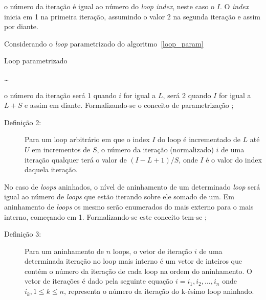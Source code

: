 o número da iteração é igual ao número do \textit{loop index}, neste caso o $I$.
O \textit{index} inicia em 1 na primeira iteração, assumindo o valor 2 na
segunda iteração e assim por diante.

Considerando o \textit{loop} parametrizado do algoritmo~\ref{loop_param}

\begin{algorithm}
        \caption{Loop parametrizado}
        \label{loop_param}
        \begin{algorithmic}[1]
                \STATE \ldots
                \ENDFOR
        \end{algorithmic}
\end{algorithm}

\noindent o número da iteração será 1 quando $i$ for igual a $L$, será 2 quando $I$ for
igual a $L+S$ e assim em diante. 
Formalizando-se o conceito de parametrização \cite[2.2]{ocfma};

\begin{description}
        \item [Definição 2:] Para um loop arbitrário em que o index $I$ do loop é
        incrementado de $L$ até $U$ em incrementos de $S$, o número da iteração
        (normalizado) $i$ de uma iteração qualquer terá o valor de 
        $(I - L + 1)/ S$, onde $I$ é o valor do index daquela iteração.
\end{description}

No caso de \textit{loops} aninhados, o nível de aninhamento de um determinado 
\textit{loop} será igual ao número de \textit{loops} que estão iterando sobre
ele somado de um. Em aninhamento de \textit{loops} os mesmo serão enumerados do
mais externo para o mais interno, começando em 1. Formalizando-se este conceito
tem-se \cite[2.2]{ocfma};

\begin{description}
        \item[Definição 3:] Para um aninhamento de $n$ loops, o vetor de
                iteração $i$ de uma determinada iteração no loop mais interno 
                é um vetor de inteiros que contém o número da iteração de cada 
                loop na ordem do aninhamento. 
                O vetor de iterações é dado pela seguinte equação
                $i = {i_1, i_2, \ldots, i_n}$
                onde $i_k, 1 \leq k \leq n$, representa o número da iteração do 
                k-ésimo loop aninhado.
\end{description}

